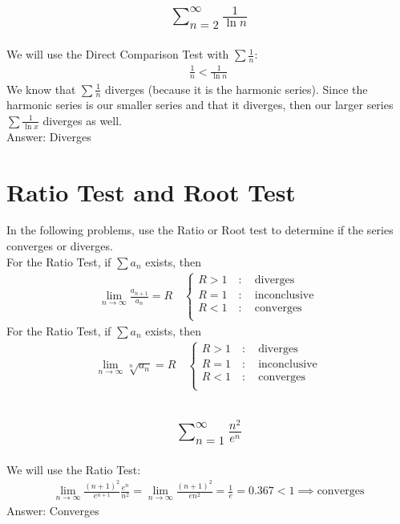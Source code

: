 \documentclass{article}
\begin{document}
\subsection{
	\begin{align*}
		\sum_{n = 2}^\infty \frac{1}{\ln{n}}
	\end{align*}
}
We will use the Direct Comparison Test with $\sum \frac{1}{n}$:
\begin{align*}
	\frac{1}{n} < \frac{1}{\ln{n}}
\end{align*}
We know that $\sum \frac{1}{n}$ diverges (because it is the harmonic series). Since the harmonic series is our smaller series and that it diverges, then our larger series $\sum \frac{1}{\ln{x}}$ diverges as well. \\[10pt]
Answer: Diverges

\section{Ratio Test and Root Test}
In the following problems, use the Ratio or Root test to determine if the series converges or diverges.\\[10pt]
For the Ratio Test, if $\sum a_n$ exists, then 
\begin{align*}
	\lim_{n \to \infty} \frac{a_{n + 1}}{a_n} = R \quad 
	\begin{cases}
		R > 1 \quad : \quad \text{diverges} \\
		R = 1 \quad : \quad \text{inconclusive} \\
		R < 1 \quad : \quad \text{converges} \\
	\end{cases}
\end{align*}
For the Ratio Test, if $\sum a_n$ exists, then 
\begin{align*}
	\lim_{n \to \infty} \sqrt[n]{a_n} = R \quad 
	\begin{cases}
		R > 1 \quad : \quad \text{diverges} \\
		R = 1 \quad : \quad \text{inconclusive} \\
		R < 1 \quad : \quad \text{converges} \\
	\end{cases}
\end{align*}
\subsection{
	\begin{align*}
		\sum_{n = 1}^\infty \frac{n^2}{e^n}
	\end{align*}
}
We will use the Ratio Test:
\begin{align*}
	\lim_{n \to \infty} \frac{(n + 1)^2}{e^{n + 1}} \frac{e^n}{n^2} = \lim_{n \to \infty} \frac{(n + 1)^2}{e n^2} = \frac{1}{e} = 0.367 < 1 \implies \text{converges}
\end{align*}
Answer: Converges
\end{document}
